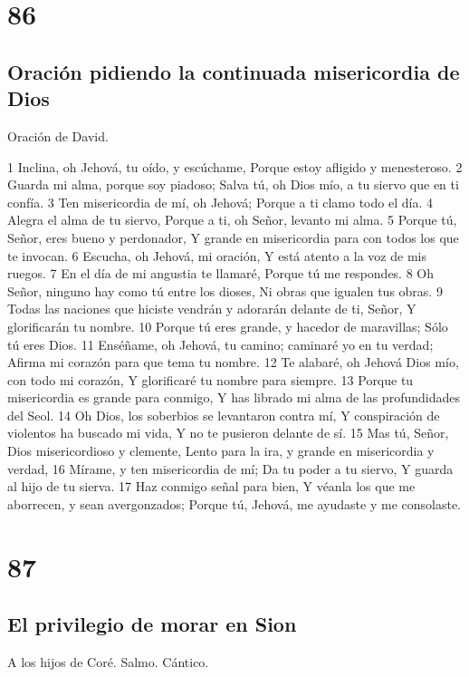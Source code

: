 \chapter{86}

\section*{Oración pidiendo la continuada misericordia de Dios}

Oración de David.

1 Inclina, oh Jehová, tu oído, y escúchame,
Porque estoy afligido y menesteroso.
2 Guarda mi alma, porque soy piadoso;
Salva tú, oh Dios mío, a tu siervo que en ti confía.
3 Ten misericordia de mí, oh Jehová;
Porque a ti clamo todo el día.
4 Alegra el alma de tu siervo,
Porque a ti, oh Señor, levanto mi alma.
5 Porque tú, Señor, eres bueno y perdonador,
Y grande en misericordia para con todos los que te invocan.
6 Escucha, oh Jehová, mi oración,
Y está atento a la voz de mis ruegos.
7 En el día de mi angustia te llamaré,
Porque tú me respondes.
8 Oh Señor, ninguno hay como tú entre los dioses,
Ni obras que igualen tus obras.
9 Todas las naciones que hiciste vendrán y adorarán delante de ti, Señor,
Y glorificarán tu nombre.
10 Porque tú eres grande, y hacedor de maravillas;
Sólo tú eres Dios.
11 Enséñame, oh Jehová, tu camino; caminaré yo en tu verdad;
Afirma mi corazón para que tema tu nombre.
12 Te alabaré, oh Jehová Dios mío, con todo mi corazón,
Y glorificaré tu nombre para siempre.
13 Porque tu misericordia es grande para conmigo,
Y has librado mi alma de las profundidades del Seol.
14 Oh Dios, los soberbios se levantaron contra mí,
Y conspiración de violentos ha buscado mi vida,
Y no te pusieron delante de sí.
15 Mas tú, Señor, Dios misericordioso y clemente,
Lento para la ira, y grande en misericordia y verdad,
16 Mírame, y ten misericordia de mí;
Da tu poder a tu siervo,
Y guarda al hijo de tu sierva.
17 Haz conmigo señal para bien,
Y véanla los que me aborrecen, y sean avergonzados;
Porque tú, Jehová, me ayudaste y me consolaste.

\chapter{87}

\section*{El privilegio de morar en Sion}

A los hijos de Coré. Salmo. Cántico.

